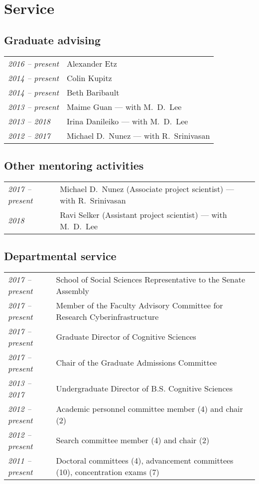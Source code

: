 \documentclass[]{article}
\def\slist{\begin{longtable}{>{\em}p{1.25in} p{5.0in}}}
\def\elist{\end{longtable}}
\begin{document}
\Needspace{0.66\textheight}
\section*{Service}

\subsection*{Graduate advising}
\slist
2016 -- present & Alexander Etz                           \\
2014 -- present & Colin Kupitz
 \\
2014 -- present & Beth Baribault                          \\
2013 -- present & Maime Guan       --- with M.~D.~Lee     \\
2013 -- 2018 & Irina Danileiko  --- with M.~D.~Lee     \\
2012 -- 2017    & Michael D.~Nunez --- with R.~Srinivasan
\elist

\subsection*{Other mentoring activities}
\slist
2017 -- present & Michael D.~Nunez (Associate project scientist) --- with R.~Srinivasan\\
2018            & Ravi Selker (Assistant project scientist) --- with M.~D.~Lee 
\elist

\subsection*{Departmental service}
\slist
2017 -- present    & School of Social Sciences Representative to the Senate Assembly\\
2017 -- present    & Member of the Faculty Advisory Committee for Research Cyberinfrastructure\\
2017 -- present    & Graduate Director of Cognitive Sciences\\
2017 -- present    & Chair of the Graduate Admissions Committee\\
2013 -- 2017       & Undergraduate Director of B.S. 
					 Cognitive Sciences\\
2012 -- present    & Academic personnel committee member (4) 
					 and chair (2)\\
2012 -- present    & Search committee member (4) and chair (2)\\
2011 -- present    & Doctoral committees (4), 
				     advancement committees (10),
                     concentration exams (7)
\elist
\end{document}
